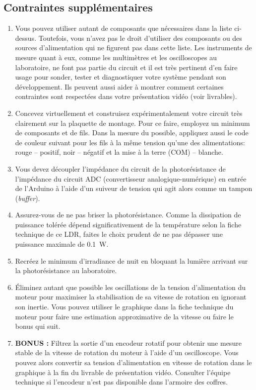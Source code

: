 \documentclass[english,french,12pt]{article}
\begin{document}
\subsection*{Contraintes supplémentaires}
\begin{enumerate}
    \item Vous pouvez utiliser autant de composants que nécessaires dans la liste ci-dessus. Toutefois, vous n’avez pas le droit d’utiliser des composants ou des sources d'alimentation qui ne figurent pas dans cette liste. Les instruments de mesure quant à eux, comme les multimètres et les oscilloscopes au laboratoire, ne font pas partie du circuit et il est très pertinent d'en faire usage pour sonder, tester et diagnostiquer votre système pendant son développement. Ils peuvent aussi aider à montrer comment certaines contraintes sont respectées dans votre présentation vidéo (voir livrables).
    \item Concevez virtuellement et construisez expérimentalement votre circuit très clairement sur la plaquette de montage. Pour ce faire, employez un minimum de composants et de fils. Dans la mesure du possible, appliquez aussi le code de couleur suivant pour les fils à la même tension qu'une des alimentations: rouge -- positif, noir -- négatif et la mise à la terre (COM) -- blanche.
    \item Vous devez découpler l’impédance du circuit de la photorésistance de l’impédance du circuit ADC (convertisseur analogique-numérique) en entrée de l’Arduino à l'aide d'un suiveur de tension qui agit alors comme un tampon (\textit{buffer}).
    \item Assurez-vous de ne pas briser la photorésistance. Comme la dissipation de puissance tolérée dépend significativement de la température selon la fiche technique de ce LDR, faites le choix prudent de ne pas dépasser une puissance maximale de \SI{0.1}{W}.
    \item Recréez le minimum d'irradiance de nuit en bloquant la lumière arrivant sur la photorésistance au laboratoire.
    \item Éliminez autant que possible les oscillations de la tension d'alimentation du moteur pour maximiser la stabilisation de sa vitesse de rotation en ignorant son inertie. Vous pouvez utiliser le graphique dans la fiche technique du moteur pour faire une estimation approximative de la vitesse ou faire le bonus qui suit. 
    \item \textbf{BONUS :} Filtrez la sortie d'un encodeur rotatif pour obtenir une mesure stable de la vitesse de rotation du moteur à l'aide d'un oscilloscope. Vous pouvez alors convertir sa tension d'alimentation en vitesse de rotation dans le graphique à la fin du livrable de présentation vidéo. Consulter l'équipe technique si l'encodeur n'est pas disponible dans l'armoire des coffres.
\end{enumerate}
\vspace{-3ex}
\end{document}
